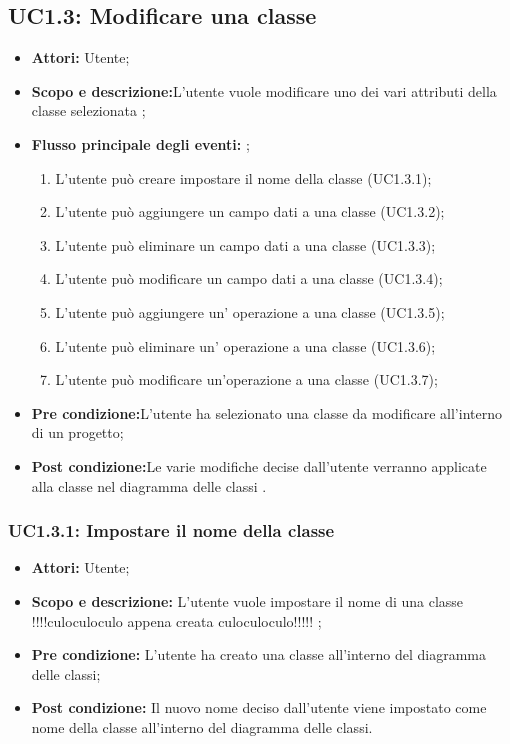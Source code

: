 \documentclass[a4paper]{report}
\begin{document}
\subsection{UC1.3: Modificare una classe}
\begin{itemize}
	\item \textbf{Attori:} Utente;
	\item \textbf{Scopo e descrizione:}L'utente vuole modificare uno dei vari attributi della classe selezionata ;
	\item \textbf{Flusso principale degli eventi: } ;
	\begin{enumerate}
		\item L'utente può creare impostare il nome della classe (UC1.3.1);
		\item L'utente può aggiungere un campo dati a una classe (UC1.3.2);
		\item L'utente può eliminare un campo dati a una classe (UC1.3.3);
		\item L'utente può modificare un campo dati a una classe (UC1.3.4);
		\item L'utente può aggiungere un' operazione a una classe (UC1.3.5);
		\item L'utente può eliminare un' operazione a una classe (UC1.3.6);
		\item L'utente può modificare un'operazione a una classe (UC1.3.7);
	\end{enumerate}
	\item \textbf{Pre condizione:}L'utente ha selezionato una classe da modificare all'interno di un progetto;
	\item \textbf{Post condizione:}Le varie modifiche decise dall'utente verranno applicate alla classe nel diagramma delle classi .
\end{itemize}

\subsubsection{UC1.3.1: Impostare il nome della classe}
\begin{itemize}
	\item \textbf{Attori:} Utente;
	\item \textbf{Scopo e descrizione: }L'utente vuole impostare il nome di una classe  !!!!culoculoculo  appena creata culoculoculo!!!!!  ;
	\item \textbf{Pre condizione: }L'utente ha creato una classe all'interno del diagramma delle classi;
	\item \textbf{Post condizione: }Il nuovo nome deciso dall'utente viene impostato come nome della classe all'interno del diagramma delle classi.
\end{itemize}
\end{document}
